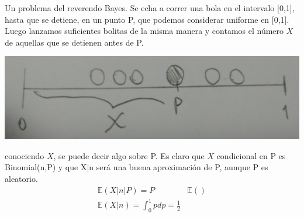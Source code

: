 \documentclass[10pt]{article}
\theoremstyle{plain}
\theoremstyle{definition}
\begin{document}
Un problema del reverendo Bayes. Se echa a correr una bola en el intervalo [0,1], hasta que se detiene, en un punto P, que podemos considerar uniforme en [0,1]. Luego lanzamos suficientes bolitas de la misma manera y contamos el número $X$ de aquellas que se detienen antes de P.
\begin{center}
\includegraphics[scale=0.1]{imagenes/bayesiano1.jpg}
\end{center}
conociendo $X$, se puede decir algo sobre P. Es claro que $X$ condicional en P es Binomial(n,P) y que X|n será una buena aproximación de P, aunque P es aleatorio.
\begin{align*}
\mathbb{E}(X|n|P) = P & \mathbb{E}()\\
\mathbb{E}(X|n) = \int_{0}^{1} p dp = \frac{1}{2}
\end{align*}
\end{document}
